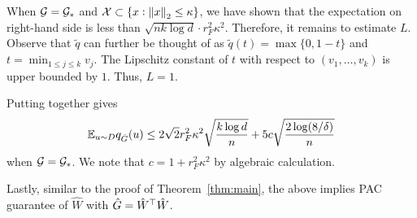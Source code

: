 When $\mathcal{G} = \mathcal{G}_*$ and $\mathcal{X} \subset \{x: \left\lVert x \right\rVert_{2} \leq  \kappa\}$, we have shown that the expectation on right-hand side is less than $\sqrt{nk \log d} \cdot r_F^2 \kappa^2$. Therefore, it remains to estimate $L$. Observe that $\tilde{q}$ can further be thought of as $\tilde{q}(t) = \max\{0, 1 - t\}$ and $t = \min_{1 \leq j \leq k} v_j$. The Lipschitz constant of $t$ with respect to $(v_1, \dots, v_k)$ is upper bounded by $1$. Thus, $L=1$.

Putting together gives
\begin{equation}
\mathbb{E}_{u \sim D} q_{\hat{G}}(u) \leq 2\sqrt{2} r_F^2 \kappa^2 \sqrt{\frac{k \log d}{n}} + 5c \sqrt{\frac{2 \log(8/\delta)}{n}}
\end{equation}
when $\mathcal{G} = \mathcal{G}_*$. We note that $c = 1 + r_F^2 \kappa^2$ by algebraic calculation.

Lastly, similar to the proof of Theorem~\ref{thm:main}, the above implies PAC guarantee of $\hat{W}$ with $\hat{G} = \hat{W}^{\top} \hat{W}$.

